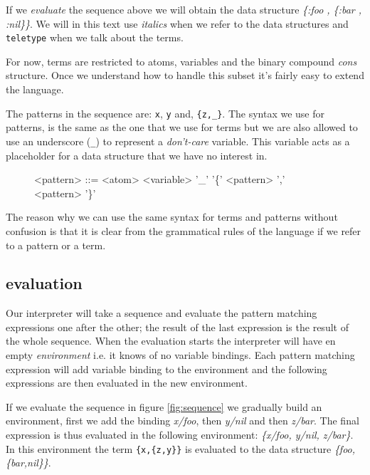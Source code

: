 \documentclass[a4paper,11pt]{article}
\begin{document}
If we {\em evaluate} the sequence above we will obtain the data
structure \textit{ \{:foo , \{:bar , :nil\}\}}. We will in this
text use {\it italics} when we refer to the data structures and
\verb+teletype+ when we talk about the terms.

For now, terms are restricted to atoms, variables and the binary
compound {\em cons} structure. Once we understand how to handle this
subset it's fairly easy to extend the language.

The patterns in the sequence are: \verb+x+, \verb+y+ and,
\verb+{z,_}+. The syntax we use for patterns, is the same as the one
that we use for terms but we are also allowed to use an underscore
(\verb+_+) to represent a {\em don't-care} variable. This variable
acts as a placeholder for a data structure that we have no interest
in.

\begin{figure}[h]
\begin{grammar}

<pattern> ::= <atom>
\alt <variable>
\alt '_'  
\alt '\{' <pattern> ',' <pattern> '\}'
\end{grammar}
\end{figure}

The reason why we can use the same syntax for terms and patterns
without confusion is that it is clear from the grammatical rules of the
language if we refer to a pattern or a term. 

\subsection{evaluation}

Our interpreter will take a sequence and evaluate the pattern matching
expressions one after the other; the result of the last expression is
the result of the whole sequence. When the evaluation starts the
interpreter will have en empty {\em environment} i.e. it knows of no
variable bindings. Each pattern matching expression will add variable
binding to the environment and the following expressions are then
evaluated in the new environment.
 
If we evaluate the sequence in figure \ref{fig:sequence} we gradually
build an environment, first we add the binding {\em x/foo}, then {\em
  y/nil} and then {\em z/bar}. The final expression is thus evaluated
in the following environment: {\em \{x/foo, y/nil, z/bar\}}. In this
environment the term \verb+{x,{z,y}}+ is evaluated to the data
structure {\em \{foo,\{bar,nil\}\}}.
\end{document}
